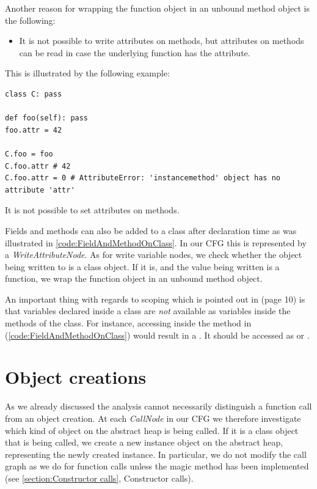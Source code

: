 Another reason for wrapping the function object in an unbound method object is the following:

\begin{itemize}
	\item It is not possible to write attributes on methods, but attributes on methods can be read in case the underlying function has the attribute.
\end{itemize}

This is illustrated by the following example:

\begin{listing}[H]
	\begin{verbatim}
class C: pass

def foo(self): pass
foo.attr = 42

C.foo = foo
C.foo.attr # 42
C.foo.attr = 0 # AttributeError: 'instancemethod' object has no attribute 'attr'
	\end{verbatim}
	\caption{It is not possible to set attributes on methods.}
\end{listing}

Fields and methods can also be added to a class after declaration time as was illustrated in \autoref{code:FieldAndMethodOnClass}. In our CFG this is represented by a \textit{WriteAttributeNode}. As for write variable nodes, we check whether the object being written to is a class object. If it is, and the value being written is a function, we wrap the function object in an unbound method object.

An important thing with regards to scoping which is pointed out in \cite{lamdapy} (page 10) is that variables declared inside a class are \textit{not} available as variables inside the methods of the class. For instance, accessing  inside the method  in (\autoref{code:FieldAndMethodOnClass}) would result in a . It should be accessed as  or . 


\section{Object creations}
\label{section: Object creations}
As we already discussed the analysis cannot necessarily distinguish a function call from an object creation. At each \textit{CallNode} in our CFG we therefore investigate which kind of object on the abstract heap is being called. If it is a class object that is being called, we create a new instance object on the abstract heap, representing the newly created instance. In particular, we do not modify the call graph as we do for function calls unless the magic method  has been implemented (see \autoref{section:Constructor calls}, Constructor calls).

